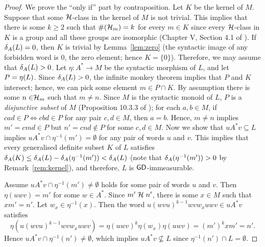 \begin{proof}
We prove the ``only if'' part by contraposition.
Let \(K\) be the kernel of \(M\).
Suppose that some \(\mathrel{\cal H}\)-class in the kernel of \(M\) is not trivial.
This implies that there is some \(k \geq 2\) such that \(\#\!\left(\mathrel{\cal H}_m\right) = k\) for every \(m \in K\) since every \(\mathrel{\cal H}\)-class in \(K\) is a group and all these groups are isomorphic (\cf Chapter V, Section 4.1 of \cite{MPRI}).
If \(\delta_{A}(L) = 0\), then \(K\) is trivial by Lemma~\ref{lem:zero} (the syntactic image of any forbidden word is \(0\), the zero element; hence \(K = \{0\}\)).
Therefore, we may assume that \(\delta_{A}(L) > 0\).
Let \(\eta\colon A^* \rightarrow M\) be the syntactic morphism of \(L\), and let \(P = \eta(L)\).
Since \(\delta_{A}(L) > 0\), the infinite monkey theorem implies that \(P\) and \(K\) intersect; hence, we can pick some element \(m \in P \cap K\).
By assumption there is some \(n \in \mathrel{\cal H}_m\) such that \(m \neq n\).
Since \(M\) is the syntactic monoid of \(L\),
\(P\) is a \emph{disjunctive subset} of \(M\) (\cf Proposition 10.3.3 of \cite{Lawson}); \ie
for each \(a, b \in M\), if 
\(cad \in P \Leftrightarrow cbd \in P\) for any pair \(c,d \in M\), then \(a = b\).
Hence, \(m \neq n\) implies \(m' = cmd \in P\) but \(n' = cnd \notin P\) for some \(c, d \in M\).
Now we show that \(u A^* v \subseteq L\) implies
\(u A^* v \cap \eta^{-1}(m') = \emptyset\) for any pair of words \(u\) and \(v\).
This implies that every generalised definite subset \(K\) of \(L\) satisfies \(\delta_{A}(K) \leq \delta_{A}(L) - \delta_{A}(\eta^{-1}(m')) < \delta_{A}(L)\) (note that \(\delta_{A}(\eta^{-1}(m')) > 0\) by Remark~\ref{rem:kernel}), and therefore, \(L\) is \(\mathsf{GD}\)-immeasurable.

Assume \(u A^* v \cap \eta^{-1}(m') \neq \emptyset \) holds for some pair of words \(u\) and \(v\).
Then \(\eta(uwv) = m'\) for some \(w \in A^*\).
Since \(m' \mathrel{\mathrel{\cal H}} n'\), there is some \(x \in M\) such that \(xm' = n'\).
Let \(w_x \in \eta^{-1}(x)\).
Then the word \(u (wvu)^{k-1} w v w_x uwv \in u A^* v\) satisfies
\[
 \eta(u (wvu)^{k-1} w v w_x uwv) = 
\eta(uwv)^k \eta(w_x) \eta(uwv) =
(m')^k x m' = n'.
\]
Hence \(u A^* v \cap \eta^{-1}(n') \neq \emptyset\), which implies \(u A^* v \not\subseteq L\) since \(\eta^{-1}(n') \cap L = \emptyset\).
\end{proof}
